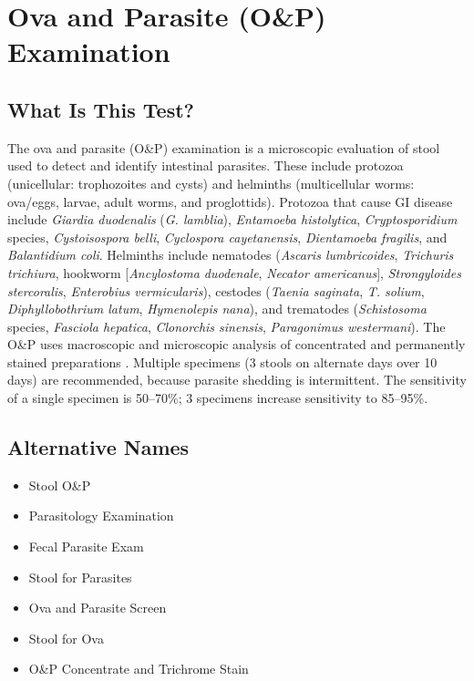\chapter{Ova and Parasite (O\&P) Examination}

\section*{What Is This Test?}
The ova and parasite (O\&P) examination is a microscopic evaluation of stool used to detect and identify intestinal parasites. These include protozoa (unicellular: trophozoites and cysts) and helminths (multicellular worms: ova/eggs, larvae, adult worms, and proglottids). Protozoa that cause GI disease include \textit{Giardia duodenalis} (\textit{G. lamblia}), \textit{Entamoeba histolytica}, \textit{Cryptosporidium} species, \textit{Cystoisospora belli}, \textit{Cyclospora cayetanensis}, \textit{Dientamoeba fragilis}, and \textit{Balantidium coli}. Helminths include nematodes (\textit{Ascaris lumbricoides}, \textit{Trichuris trichiura}, hookworm [\textit{Ancylostoma duodenale}, \textit{Necator americanus}], \textit{Strongyloides stercoralis}, \textit{Enterobius vermicularis}), cestodes (\textit{Taenia saginata}, \textit{T. solium}, \textit{Diphyllobothrium latum}, \textit{Hymenolepis nana}), and trematodes (\textit{Schistosoma} species, \textit{Fasciola hepatica}, \textit{Clonorchis sinensis}, \textit{Paragonimus westermani}). The O\&P uses macroscopic and microscopic analysis of concentrated and permanently stained preparations \cite{garcia2016diagnostic}. Multiple specimens (3 stools on alternate days over 10 days) are recommended, because parasite shedding is intermittent. The sensitivity of a single specimen is 50--70\%; 3 specimens increase sensitivity to 85--95\%.

\section*{Alternative Names}
\begin{itemize}
  \item Stool O\&P
  \item Parasitology Examination
  \item Fecal Parasite Exam
  \item Stool for Parasites
  \item Ova and Parasite Screen
  \item Stool for Ova
  \item O\&P Concentrate and Trichrome Stain
\end{itemize}
